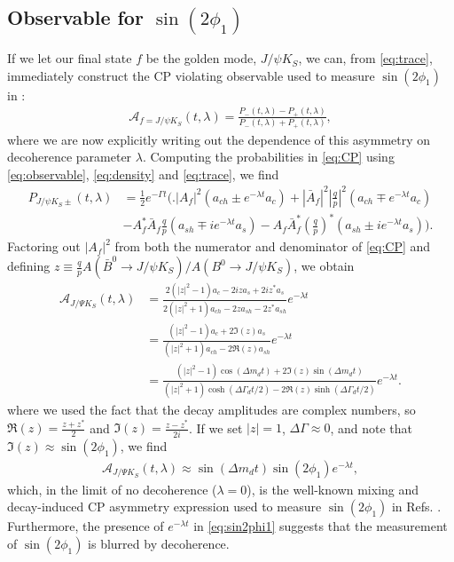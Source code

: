 \subsection{Observable for $\sin(2\phi_1)$}
If we let our final state $f$ be the golden mode, $J/\psi K_S$, we can, from \ref{eq:trace}, immediately construct the CP violating observable used to measure $\sin(2\phi_1)$ in \cite{Abe1}:
\begin{align}
\label{eq:CP}
\mathcal{A}_{f=J/\psi K_S}(t,\lambda) =\frac{P_-(t,\lambda)-P_+(t,\lambda)}{P_-(t,\lambda)+P_+(t,\lambda)},
\end{align}
where we are now explicitly writing out the dependence of this asymmetry on decoherence parameter $\lambda$. Computing the probabilities in \ref{eq:CP} using \ref{eq:observable}, \ref{eq:density} and \ref{eq:trace}, we find
\begin{align}
\label{eq:probs}
P_{J/\psi K_S\pm}(t,\lambda) &= \frac{1}{2}e^{-\Gamma t}\Bigg( \Bigg.|A_f|^2(a_{ch}\pm e^{-\lambda t}a_c)+|\bar{A}_f|^2\left|\frac{q}{p}\right|^2(a_{ch}\mp e^{-\lambda t}a_c) \nonumber\\  &-A_f^*\bar{A}_f\frac{q}{p}(a_{sh}\mp ie^{-\lambda t}a_s) - A_f\bar{A}_f^*\left(\frac{q}{p}\right)^*(a_{sh}\pm ie^{-\lambda t}a_s)\Bigg) \Bigg.
\end{align}
Factoring out $|A_f|^2$ from both the numerator and denominator of \ref{eq:CP} and defining $z\equiv \frac{q}{p} A(\bar{B}^0\rightarrow J/\psi K_S)/A(B^0\rightarrow J/\psi K_S)$, we obtain
\begin{align}
\label{eq:cpviolation}
\mathcal{A}_{J/\Psi K_S}(t,\lambda)&=\frac{2(|z|^2-1)a_c - 2iz a_s + 2iz^*a_s}{2(|z|^2+1)a_{ch} -2z a_{sh} -2z^*a_{sh}}e^{-\lambda t}\nonumber\\
&=\frac{(|z|^2-1)a_c + 2\Im(z)a_s}{(|z|^2+1)a_{ch} -2\Re(z) a_{sh}}e^{-\lambda t}\nonumber\\
&=\frac{(|z|^2-1)\cos(\Delta m_d t) + 2\Im(z)\sin(\Delta m_d t)}{(|z|^2+1)\cosh(\Delta \Gamma_d t/2) -2\Re(z) \sinh(\Delta\Gamma_d t/2)}e^{-\lambda t}.
\end{align}
where we used the fact that the decay amplitudes are complex numbers, so $\Re(z)=\frac{z+z^*}{2}$ and $\Im(z) = \frac{z-z^*}{2i}$. If we set $|z|=1$, $\Delta \Gamma \approx 0$, and note that $\Im(z)\approx \sin(2\phi_1)$, we find
\begin{align}
\label{eq:sin2phi1}
\mathcal{A}_{J/\Psi K_S}(t,\lambda) \approx \sin(\Delta m_d t)\sin(2\phi_1)e^{-\lambda t},
\end{align} 
which, in the limit of no decoherence ($\lambda = 0$), is the well-known mixing and decay-induced CP asymmetry expression used to measure $\sin(2\phi_1)$ in Refs. \cite{Abe1,Abe2}. Furthermore, the presence of $e^{-\lambda t}$ in \ref{eq:sin2phi1} suggests that the measurement of $\sin(2\phi_1)$ is blurred by decoherence.

